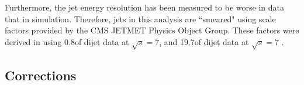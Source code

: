 Furthermore, the jet energy resolution has been measured to be worse in data that in simulation.
Therefore, jets in this analysis are ``smeared" using scale factors provided by the CMS JETMET
Physics Object Group. These factors were derived in \cite{Chatrchyan:2011ds} using 0.8\fbinv of dijet data at
$\sqrt{s}=7$, and 19.7\fbinv of dijet data at $\sqrt{s}=7$ \cite{jet_res_2012}.

\subsection{\met Corrections}
\label{ss:met_corrections}



% 
% 
% 
% 
% 
% 
% 
